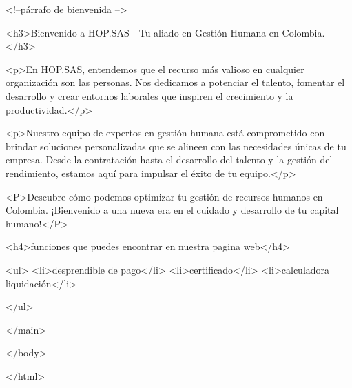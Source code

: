           <!--párrafo de bienvenida --> 

          <h3>Bienvenido a HOP.SAS - Tu aliado en Gestión Humana en Colombia.</h3>

          
          <p>En HOP.SAS, entendemos que el recurso más valioso en cualquier organización son las personas. Nos dedicamos a potenciar el talento, fomentar el desarrollo y crear entornos laborales que inspiren el crecimiento y la productividad.</p>

          <p>Nuestro equipo de expertos en gestión humana está comprometido con brindar soluciones personalizadas que se alineen con las necesidades únicas de tu empresa. Desde la contratación hasta el desarrollo del talento y la gestión del rendimiento, estamos aquí para impulsar el éxito de tu equipo.</p>
          
          <P>Descubre cómo podemos optimizar tu gestión de recursos humanos en Colombia. ¡Bienvenido a una nueva era en el cuidado y desarrollo de tu capital humano!</P>



          <h4>funciones que puedes encontrar en nuestra pagina web</h4>


          <ul>
            <li>desprendible de pago</li>
            <li>certificado</li>
            <li>calculadora liquidación</li>
  
           </ul>
  
        </main>


    </body>


</html>
